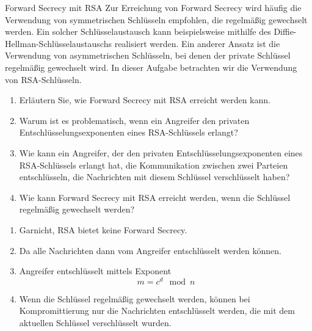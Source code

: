 \documentclass{article}
\begin{document}
\begin{exercise}{Forward Secrecy mit RSA}
  Zur Erreichung von Forward Secrecy wird häufig die Verwendung von symmetrischen Schlüsseln empfohlen, die regelmäßig gewechselt werden. Ein solcher Schlüsselaustausch kann beispielsweise mithilfe des Diffie-Hellman-Schlüsselaustauschs realisiert werden. Ein anderer Ansatz ist die Verwendung von asymmetrischen Schlüsseln, bei denen der private Schlüssel regelmäßig gewechselt wird. In dieser Aufgabe betrachten wir die Verwendung von RSA-Schlüsseln.
  \begin{enumerate}
    \item Erläutern Sie, wie Forward Secrecy mit RSA erreicht werden kann.
    \item Warum ist es problematisch, wenn ein Angreifer den privaten Entschlüsselungsexponenten eines RSA-Schlüssels erlangt?
    \item Wie kann ein Angreifer, der den privaten Entschlüsselungsexponenten eines RSA-Schlüssels erlangt hat, die Kommunikation zwischen zwei Parteien entschlüsseln, die Nachrichten mit diesem Schlüssel verschlüsselt haben?
    \item Wie kann Forward Secrecy mit RSA erreicht werden, wenn die Schlüssel regelmäßig gewechselt werden?
  \end{enumerate}

  \begin{solution}
    \begin{enumerate}
        \item Garnicht, RSA bietet keine Forward Secrecy.
        \item Da alle Nachrichten dann vom Angreifer entschlüsselt werden können.
        \item Angreifer entschlüsselt mittels Exponent
          \[ m=c^d \mod{n} \]
        \item Wenn die Schlüssel regelmäßig gewechselt werden, können bei Kompromittierung nur die Nachrichten entschlüsselt werden, die mit dem aktuellen Schlüssel verschlüsselt wurden.
    \end{enumerate}
  \end{solution}
\end{exercise}
\end{document}

